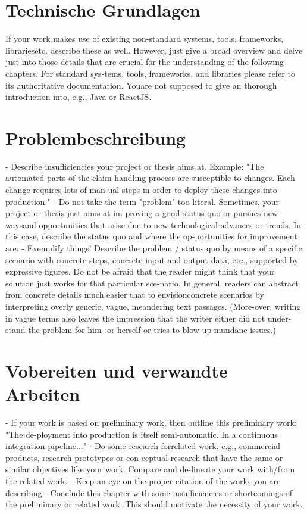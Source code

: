 \section{Technische Grundlagen}

If your work makes use of existing non-standard systems, tools, frameworks, librariesetc. describe these as well. However, just give a broad overview and delve just into those details that are crucial for the understanding of the following chapters. For standard sys-tems, tools, frameworks, and libraries please refer to its authoritative documentation. Youare not supposed to give an thorough introduction into, e.g., Java or ReactJS.

\section{Problembeschreibung}

- Describe insufficiencies your project or thesis aims at. Example: "The automated parts of the claim handling process are susceptible to changes. Each change requires lots of man-ual steps in order to deploy these changes into production."
- Do not take the term "problem" too literal. Sometimes, your project or thesis just aims at im-proving a good status quo or pursues new waysand opportunities that arise due to new technological advances or trends. In this case, describe the status quo and where the op-portunities for improvement are.
- Exemplify things! Describe the problem / status quo by means of a specific scenario with concrete steps, concrete input and output data, etc., supported by expressive figures. Do not be afraid that the reader might think that your solution just works for that particular sce-nario. In general, readers can abstract from concrete details much easier that to envisionconcrete scenarios by interpreting overly generic, vague, meandering text passages. (More-over, writing in vague terms also leaves the impression that the writer either did not under-stand the problem for him- or herself or tries to blow up mundane issues.)

\section{Vobereiten und verwandte Arbeiten}

- If your work is based on preliminary work, then outline this preliminary work: "The de-ployment into production is itself semi-automatic. In a continuous integration pipeline..."
- Do some research forrelated work, e.g., commercial products, research prototypes or con-ceptual research that have the same or similar objectives like your work. Compare and de-lineate your work with/from the related work.
- Keep an eye on the proper citation of the works you are describing
- Conclude this chapter with some insufficiencies or shortcomings of the preliminary or related work. This should motivate the necessity of your work.

